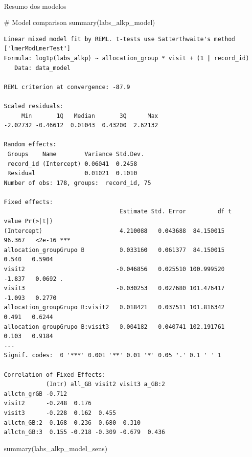 \documentclass[
  12pt,
]{article}
\makeatletter
\let\oldparagraph\paragraph
\renewcommand{\paragraph}{
    \@ifstar
      \xxxParagraphStar
      \xxxParagraphNoStar
  }
\newcommand{\xxxParagraphStar}[1]{\oldparagraph*{#1}\mbox{}}
\newcommand{\xxxParagraphNoStar}[1]{\oldparagraph{#1}\mbox{}}
\newenvironment{Shaded}{\begin{snugshade}}{\end{snugshade}}
\newcommand{\CommentTok}[1]{\textcolor[rgb]{0.37,0.37,0.37}{#1}}
\newcommand{\FunctionTok}[1]{\textcolor[rgb]{0.28,0.35,0.67}{#1}}
\newcommand{\NormalTok}[1]{\textcolor[rgb]{0.00,0.23,0.31}{#1}}
\makeatother
\begin{document}
\paragraph{Resumo dos modelos}\label{resumo-dos-modelos-3}

\begin{Shaded}
\begin{Highlighting}[]
\CommentTok{\# Model comparison}
\FunctionTok{summary}\NormalTok{(labs\_alkp\_model)}
\end{Highlighting}
\end{Shaded}

\begin{verbatim}
Linear mixed model fit by REML. t-tests use Satterthwaite's method ['lmerModLmerTest']
Formula: log1p(labs_alkp) ~ allocation_group * visit + (1 | record_id)
   Data: data_model

REML criterion at convergence: -87.9

Scaled residuals: 
     Min       1Q   Median       3Q      Max 
-2.02732 -0.46612  0.01043  0.43200  2.62132 

Random effects:
 Groups    Name        Variance Std.Dev.
 record_id (Intercept) 0.06041  0.2458  
 Residual              0.01021  0.1010  
Number of obs: 178, groups:  record_id, 75

Fixed effects:
                                 Estimate Std. Error         df t value Pr(>|t|)    
(Intercept)                      4.210088   0.043688  84.150015  96.367   <2e-16 ***
allocation_groupGrupo B          0.033160   0.061377  84.150015   0.540   0.5904    
visit2                          -0.046856   0.025510 100.999520  -1.837   0.0692 .  
visit3                          -0.030253   0.027680 101.476417  -1.093   0.2770    
allocation_groupGrupo B:visit2   0.018421   0.037511 101.816342   0.491   0.6244    
allocation_groupGrupo B:visit3   0.004182   0.040741 102.191761   0.103   0.9184    
---
Signif. codes:  0 '***' 0.001 '**' 0.01 '*' 0.05 '.' 0.1 ' ' 1

Correlation of Fixed Effects:
            (Intr) all_GB visit2 visit3 a_GB:2
allctn_grGB -0.712                            
visit2      -0.248  0.176                     
visit3      -0.228  0.162  0.455              
allctn_GB:2  0.168 -0.236 -0.680 -0.310       
allctn_GB:3  0.155 -0.218 -0.309 -0.679  0.436
\end{verbatim}

\begin{Shaded}
\begin{Highlighting}[]
\FunctionTok{summary}\NormalTok{(labs\_alkp\_model\_sens)}
\end{Highlighting}
\end{Shaded}
\end{document}
